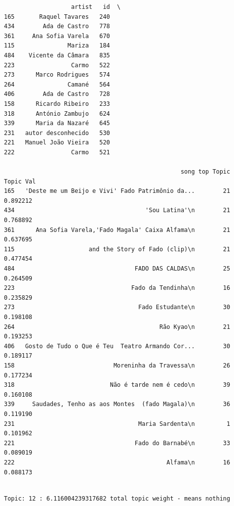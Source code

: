 \documentclass[11pt]{article}
\begin{document}
    
    \begin{verbatim}
                   artist   id  \
165       Raquel Tavares   240   
434        Ada de Castro   778   
361     Ana Sofia Varela   670   
115               Mariza   184   
484    Vicente da Câmara   835   
223                Carmo   522   
273      Marco Rodrigues   574   
264               Camané   564   
406        Ada de Castro   728   
158      Ricardo Ribeiro   233   
318      António Zambujo   624   
339      Maria da Nazaré   645   
231   autor desconhecido   530   
221   Manuel João Vieira   520   
222                Carmo   521   

                                                  song top Topic  Topic Val  
165   'Deste me um Beijo e Vivi' Fado Patrimônio da...        21   0.892212  
434                                     'Sou Latina'\n        21   0.768892  
361      Ana Sofia Varela,'Fado Magala' Caixa Alfama\n        21   0.637695  
115                     and the Story of Fado (clip)\n        21   0.477454  
484                                  FADO DAS CALDAS\n        25   0.264509  
223                                 Fado da Tendinha\n        16   0.235829  
273                                   Fado Estudante\n        30   0.198108  
264                                         Rão Kyao\n        21   0.193253  
406   Gosto de Tudo o Que é Teu  Teatro Armando Cor...        30   0.189117  
158                            Moreninha da Travessa\n        26   0.177234  
318                           Não é tarde nem é cedo\n        39   0.160108  
339     Saudades, Tenho as aos Montes  (fado Magala)\n        36   0.119190  
231                                   Maria Sardenta\n         1   0.101962  
221                                  Fado do Barnabé\n        33   0.089019  
222                                           Alfama\n        16   0.088173  
    \end{verbatim}

    
    \begin{Verbatim}[commandchars=\\\{\}]

Topic: 12 : 6.116004239317682 total topic weight - means nothing

    \end{Verbatim}
\end{document}
